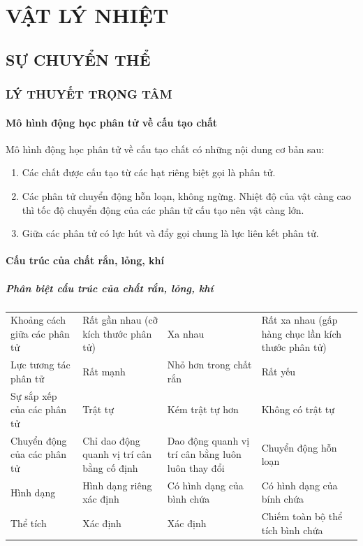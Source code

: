 \setcounter{section}{0}
\chapter{VẬT LÝ NHIỆT}
\section{SỰ CHUYỂN THỂ}
\subsection{LÝ THUYẾT TRỌNG TÂM}
\begin{tomtat}
\subsubsection{Mô hình động học phân tử về cấu tạo chất}
\begin{boxdn}
	Mô hình động học phân tử về cấu tạo chất có những nội dung cơ bản sau:
	\begin{enumerate}[label=\arabic*.]
		\item Các chất được cấu tạo từ các hạt riêng biệt gọi là phân tử.
		\item Các phân tử chuyển động hỗn loạn, không ngừng. Nhiệt độ của vật càng cao thì tốc độ chuyển động của các phân tử cấu tạo nên vật càng lớn.
		\item Giữa các phân tử có lực hút và đẩy gọi chung là lực liên kết phân tử.
	\end{enumerate}
\end{boxdn}
\subsubsection{Cấu trúc của chất rắn, lỏng, khí}
\paragraph{Phân biệt cấu trúc của chất rắn, lỏng, khí}
\begin{center}
	\begin{tabular}{|p{4cm}|p{4cm}|p{4cm}|p{4cm}|}
		\hline
		\rowcolor{blue!25!white}
		\thead{Đặc điểm}&\thead{Thể rắn} &\thead{Thể lỏng}&\thead{Thể khí}\\
		\hline
		Khoảng cách giữa các phân tử & Rất gần nhau (cỡ kích thước phân tử) & Xa nhau & Rất xa nhau (gấp hàng chục lần kích thước phân tử)\\
		\hline
		Lực tương tác phân tử & Rất mạnh & Nhỏ hơn trong chất rắn & Rất yếu\\
		\hline
		Sự sắp xếp của các phân tử & Trật tự & Kém trật tự hơn & Không có trật tự\\
		\hline
		Chuyển động của các phân tử & Chỉ dao động quanh vị trí cân bằng cố định & Dao động quanh vị trí cân bằng luôn luôn thay đổi & Chuyển động hỗn loạn \\
		\hline
		Hình dạng & Hình dạng riêng xác định & Có hình dạng của bình chứa & Có hình dạng của bính chứa\\
		\hline
		Thể tích & Xác định & Xác định & Chiếm toàn bộ thể tích bình chứa\\
		\hline
	\end{tabular}
\end{center}

\end{tomtat}
